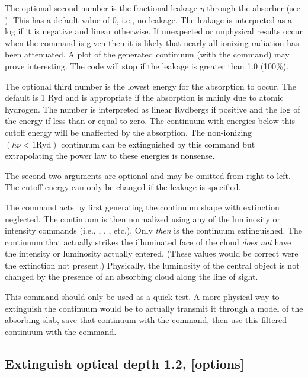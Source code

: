 The optional second number is the fractional leakage $\eta$ through the
absorber (see \citealp{FerlandMushotzky1982}).
This has a default value of
0, i.e., no leakage.
The leakage is interpreted as a log if it is negative
and linear otherwise.
If unexpected or unphysical results occur when the
 command is given then it is likely that
nearly all ionizing
radiation has been attenuated.
A plot of the generated continuum (with
the  command) may prove interesting.  The code will stop if
the leakage is greater than 1.0 (100\%).

The optional third number is the lowest energy for the absorption to
occur.
The default is 1 Ryd and is appropriate if the absorption is mainly
due to atomic hydrogen.
The number is interpreted as linear Rydbergs if positive
and the log of the energy if less than or equal to zero.
The continuum
with energies below this cutoff energy will be unaffected by the absorption.
The non-ionizing $(h\nu < 1 \mathrm{Ryd})$ continuum can be extinguished by this command
but extrapolating the power law to these energies is nonsense.

The second two arguments are optional and may be omitted from right to
left.
The cutoff energy can only be changed if the leakage is specified.

The command acts by first generating the continuum shape with extinction
neglected.
The continuum is then normalized using any of the luminosity
or intensity commands
(i.e., , ,
, etc.).
Only \emph{then} is the continuum extinguished.
The continuum that actually strikes
the illuminated face of the cloud \emph{does not}
have the intensity or luminosity
actually entered.  (These values would be correct were the extinction not
present.)  Physically, the luminosity of the central object is not changed
by the presence of an absorbing cloud along the line of sight.

This command should only be used as a quick test.  A more physical
way to extinguish the continuum would be to actually transmit it through
a model of the absorbing slab, save that continuum with the
 command,
then use this filtered continuum with
the  command.

\subsection{Extinguish optical depth 1.2, [options]}

